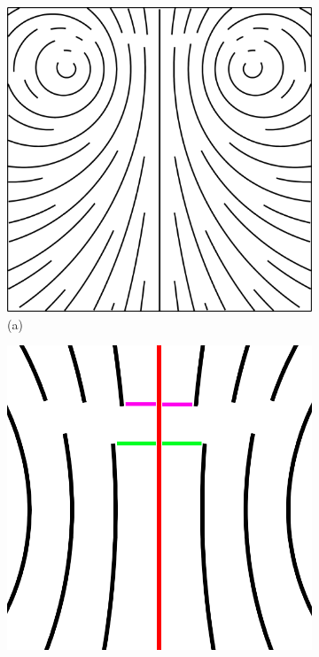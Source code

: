 \begin{figure}[ht]
    \centering
    \begin{subfigure}[b]{0.4\textwidth}
        \centering
        \includegraphics[scale=.1]{figures/OldAlgOrbit.png}
        \caption*{(a)}
    \end{subfigure}
    \begin{subfigure}[b]{0.4\textwidth}
        \centering
        \includegraphics[scale=.3]{figures/OldAlgOrbitDistsZoom.png}

\end{subfigure}
\end{figure}
